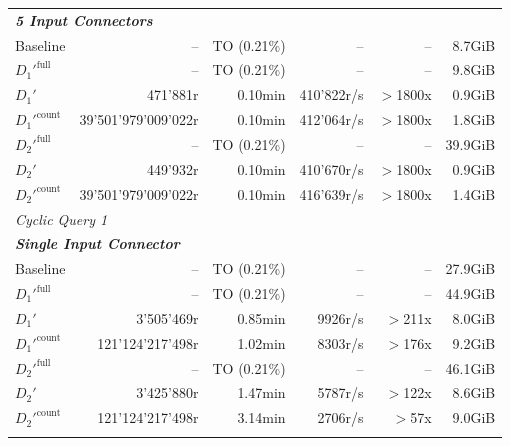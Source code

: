 \begin{longtable}{lrrrrr}
    \multicolumn{6}{l}{\textit{\textbf{5 Input Connectors}}} \\
    \nopagebreak
    Baseline              &  --                   &  TO (0.21\%)    &  --                  & --                & 8.7GiB    \\
    $D_1'^{\text{full}}$   &  --                   &  TO (0.21\%)    &  --                  & --                & 9.8GiB    \\
    \quad $D_1'$           &  471'881r             &  0.10min        &  410'822r/s          & $>$1800x           & 0.9GiB    \\
    $D_1'^{\text{count}}$  &  39'501'979'009'022r  &  0.10min        &  412'064r/s          & $>$1800x           & 1.8GiB    \\
    $D_2'^{\text{full}}$   &  --                   &  TO (0.21\%)    &  --                  & --                & 39.9GiB   \\
    \quad $D_2'$           &  449'932r             &  0.10min        &  410'670r/s          & $>$1800x           & 0.9GiB    \\
    $D_2'^{\text{count}}$  &  39'501'979'009'022r  &  0.10min        &  416'639r/s          & $>$1800x           & 1.4GiB    \\
    \midrule

    \multicolumn{6}{l}{\textit{Cyclic Query 1}} \\
    \midrule
    \multicolumn{6}{l}{\textit{\textbf{Single Input Connector}}} \\
    \nopagebreak
    Baseline               &  --                   &  TO (0.21\%)    &  --                  & --                & 27.9GiB   \\
    $D_1'^{\text{full}}$   &  --                   &  TO (0.21\%)    &  --                  & --                & 44.9GiB   \\
    \quad $D_1'$           &  3'505'469r           &  0.85min        &  9926r/s             & $>$211x           & 8.0GiB    \\
    $D_1'^{\text{count}}$  &  121'124'217'498r     &  1.02min        &  8303r/s             & $>$176x           & 9.2GiB    \\
    $D_2'^{\text{full}}$   &  --                   &  TO (0.21\%)    &  --                  & --                & 46.1GiB   \\
    \quad $D_2'$           &  3'425'880r           &  1.47min        &  5787r/s             & $>$122x           & 8.6GiB    \\
    $D_2'^{\text{count}}$  &  121'124'217'498r     &  3.14min        &  2706r/s             & $>$57x            & 9.0GiB    \\
    \addlinespace


\end{longtable}

